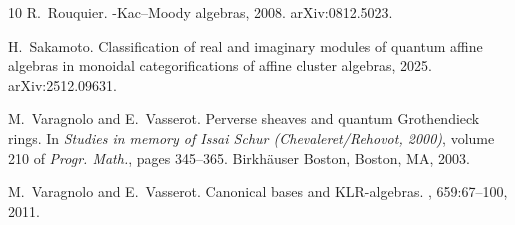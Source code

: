 \documentclass[11pt,reqno]{amsart}
\theoremstyle{definition} \newtheorem*{defn}{Definition}
\theoremstyle{definition}
\numberwithin{equation}{section}
\begin{document}
\begin{thebibliography}{10}
R.~Rouquier.
-{K}ac--{M}oody algebras, 2008.
\newblock arXiv:0812.5023.

H.~Sakamoto.
\newblock Classification of real and imaginary modules of quantum affine algebras in monoidal categorifications of affine cluster algebras, 2025.
\newblock arXiv:2512.09631.

M.~Varagnolo and E.~Vasserot.
\newblock Perverse sheaves and quantum {G}rothendieck rings.
\newblock In {\em Studies in memory of {I}ssai {S}chur ({C}hevaleret/{R}ehovot, 2000)}, volume 210 of {\em Progr. Math.}, pages 345--365. Birkh\"auser Boston, Boston, MA, 2003.

M.~Varagnolo and E.~Vasserot.
\newblock Canonical bases and {KLR}-algebras.
, 659:67--100, 2011.

\end{thebibliography}
\end{document}
